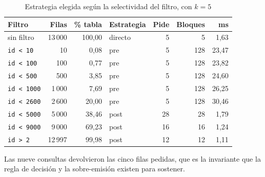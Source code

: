 \documentclass[a4paper,12pt]{article}
\begin{document}
\begin{table}[H]
\centering
\caption{Estrategia elegida según la selectividad del filtro, con $k = 5$}
\begin{tabular}{@{}lrrlrrr@{}}
\toprule
\textbf{Filtro} & \textbf{Filas} & \textbf{\% tabla} & \textbf{Estrategia} &
\textbf{Pide} & \textbf{Bloques} & \textbf{ms} \\
\midrule
sin filtro & 13\,000 & 100{,}00 & directo & 5 & 5 & 1{,}63 \\
\texttt{id \textless{} 10} & 10 & 0{,}08 & pre & 5 & 128 & 23{,}47 \\
\texttt{id \textless{} 100} & 100 & 0{,}77 & pre & 5 & 128 & 23{,}82 \\
\texttt{id \textless{} 500} & 500 & 3{,}85 & pre & 5 & 128 & 24{,}60 \\
\texttt{id \textless{} 1000} & 1\,000 & 7{,}69 & pre & 5 & 128 & 26{,}25 \\
\texttt{id \textless{} 2600} & 2\,600 & 20{,}00 & pre & 5 & 128 & 30{,}46 \\
\texttt{id \textless{} 5000} & 5\,000 & 38{,}46 & post & 28 & 28 & 1{,}79 \\
\texttt{id \textless{} 9000} & 9\,000 & 69{,}23 & post & 16 & 16 & 1{,}24 \\
\texttt{id \textgreater{} 2} & 12\,997 & 99{,}98 & post & 12 & 12 & 1{,}11 \\
\bottomrule
\end{tabular}
\end{table}

Las nueve consultas devolvieron las cinco filas pedidas, que es la invariante
que la regla de decisión y la sobre-emisión existen para sostener.
\end{document}
